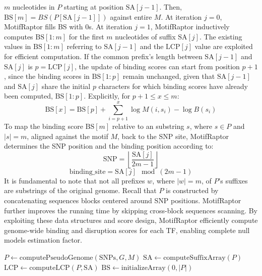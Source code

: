 \documentclass[a4paper, titlepage, openright]{book}
\newcommand{\motifraptor}{MotifRaptor\xspace}
\begin{document}
$m$ nucleotides in $P$ starting at position $\text{SA}[j-1]$. Then, $\text{BS}[m]=BS(P[\text{SA}[j-1]])$ against entire $M$. At iteration $j=0$, \motifraptor fills BS with 0s. At iteration $j=1$, \motifraptor inductively computes $\text{BS}[1:m]$ for the first $m$ nucleotides of suffix $\text{SA}[j]$. The existing values in $\text{BS}[1:m]$ referring to $\text{SA}[j-1]$ and the $\text{LCP}[j]$ value are exploited for efficient computation. If the common prefix's length between $\text{SA}[j-1]$ and $\text{SA}[j]$ is $p=\text{LCP}[j]$, the update of binding scores can start from position $p+1$, since the binding scores in $\text{BS}[1:p]$ remain unchanged, given that $\text{SA}[j-1]$ and $\text{SA}[j]$ share the initial $p$ characters for which binding scores have already been computed, $\text{BS}[1:p]$. Explicitly, for $p+1 \leq x \leq m$:
\[
    \text{BS}[x] = \text{BS}[p] + \sum^{x}_{i=p+1}{\log{M(i,s_{i})} - \log{B(s_{i})}}
\]
To map the binding score $\text{BS}[m]$ relative to an substring $s$, where $s \in P$ and $|s| = m$, aligned against the motif $M$, back to the SNP site, \motifraptor determines the SNP position and the binding position according to:
\[
    \text{SNP} = \left \lfloor \frac{\text{SA}[j]}{2m-1} \right \rfloor
\]
\[
    \text{binding\_site} = \text{SA}[j]\mod{(2m-1)}
\]
It is fundamental to note that not all prefixes $w$, where $|w|=m$, of $P$’s suffixes are substrings of the original genome. Recall that $P$ is constructed by concatenating sequences blocks centered around SNP positions. \motifraptor further improves the running time by skipping cross-block sequences scanning. By exploiting these data structures and score design, \motifraptor efficiently compute genome-wide binding and disruption scores for each TF, enabling complete null models estimation factor.

\begin{algorithm}[!]
    \caption{\motifraptor motif scanning algorithm}
    \label{alg:motifraptor-motif-scanning}
    $P \gets \text{computePseudoGenome}(\text{SNPs}, G, M)$ 
    $\text{SA} \gets \text{computeSuffixArray}(P)$ 
    $\text{LCP} \gets \text{computeLCP}(P, \text{SA})$\;
    $\text{BS} \gets \text{initializeArray}(0, |P|)$\;
\end{algorithm}
\end{document}
